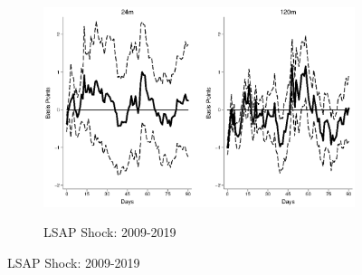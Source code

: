 \documentclass{article}
\begin{document}
\begin{figure}[tbph]
	\begin{subfigure}[t]{\textwidth}
		\begin{center}
			\includegraphics[trim={0cm 0cm 0cm 0cm},clip,height=0.26\textheight,width=1\textwidth]{../Figures/LPs/LagDep-FX/LSAP/EM/LSAPEMrho.eps} \\
			\caption{LSAP Shock: 2009-2019} \label{subfig:LPEMRHOlsap}
		\end{center}
	\end{subfigure}

\end{figure}

\pagebreak[4]
\end{document}
